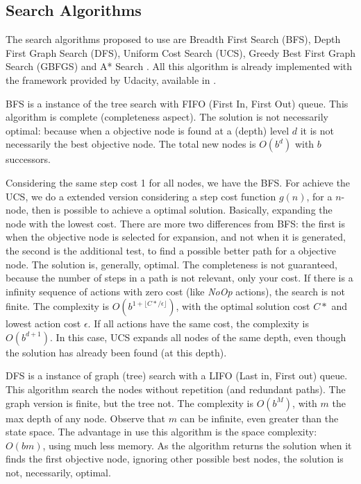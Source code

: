 \documentclass[a4paper]{article}
\begin{document}
\subsection{Search Algorithms}

The search algorithms proposed to use are Breadth First Search (BFS), Depth First Graph Search (DFS), Uniform Cost Search (UCS), Greedy Best First Graph Search (GBFGS) and A* Search \cite{githubUdacityAINDProj2}. All this algorithm is already implemented with the framework provided by Udacity, available in \cite{githubUdacityAINDProj2}.

BFS is a instance of the tree search with FIFO (First In, First Out) queue. This algorithm is complete (completeness aspect). The solution is not necessarily optimal: because when a objective node is found at a (depth) level $d$ it is not necessarily the best objective node. The total new nodes is $O(b^d)$ with $b$ successors. 

Considering the same step cost 1 for all nodes, we have the BFS. For achieve the UCS, we do a extended version considering a step cost function $g(n)$, for a $n$-node, then is possible to achieve a optimal solution. Basically, expanding the node with the lowest cost. There are more two differences from BFS: the first is when the objective node is selected for expansion, and not when it is generated, the second is the additional test, to find a possible better path for a objective node. The solution is, generally, optimal. The completeness is not guaranteed, because the number of steps in a path is not relevant, only your cost. If there is a infinity sequence of actions with zero cost (like \emph{NoOp} actions), the search is not finite. The complexity is $O(b^{1+ \lfloor C*/\epsilon \rfloor})$, with the optimal solution cost $C*$ and lowest action cost $\epsilon$. If all actions have the same cost, the complexity is $O(b^{d+1})$. In this case, UCS expands all nodes of the same depth, even though the solution has already been found (at this depth).

DFS is a instance of graph (tree) search with a LIFO (Last in, First out) queue. This algorithm search the nodes without repetition (and redundant paths). The graph version is finite, but the tree not. The complexity is $O(b^M)$, with $m$ the max depth of any node. Observe that $m$ can be infinite, even greater than the state space. The advantage in use this algorithm is the space complexity: $O(bm)$, using much less memory. As the algorithm returns the solution when it finds the first objective node, ignoring other possible best nodes, the solution is not, necessarily, optimal.
\end{document}
